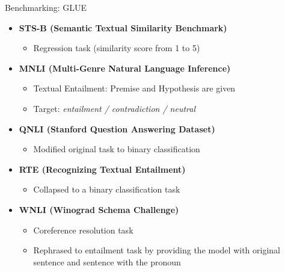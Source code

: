 \begin{vbframe}{Benchmarking: GLUE}

\vfill

\begin{itemize}
	\item \textbf{STS-B (Semantic Textual Similarity Benchmark)}
	\begin{itemize}
		\item Regression task (similarity score from 1 to 5)
	\end{itemize}
	\item \textbf{MNLI (Multi-Genre Natural Language Inference)} 
	\begin{itemize}
		\item Textual Entailment: Premise and Hypothesis are given
		\item Target: \textit{entailment / contradiction / neutral}
	\end{itemize}
	\item \textbf{QNLI (Stanford Question Answering Dataset)}
	\begin{itemize}
		\item Modified original task to binary classification
	\end{itemize}
	\item \textbf{RTE (Recognizing Textual Entailment)} 
	\begin{itemize}
		\item Collapsed to a binary classification task 
	\end{itemize}
	\item \textbf{WNLI (Winograd Schema Challenge)} 
	\begin{itemize}
		\item Coreference resolution task
		\item Rephrased to entailment task by providing the model with original sentence and sentence with the pronoun  
	\end{itemize}
\end{itemize}

\vfill

\end{vbframe}


\endlecture





